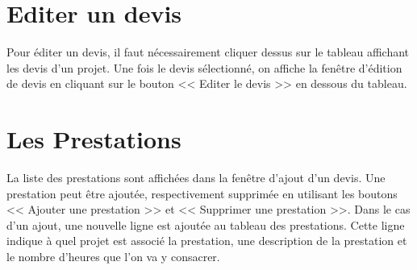 \section{Editer un devis}
Pour éditer un devis, il faut nécessairement cliquer dessus sur le tableau affichant les devis d'un projet. Une fois le devis sélectionné, on affiche la fenêtre d'édition de devis en cliquant sur le bouton << Editer le devis >> en dessous du tableau.
\section{Les Prestations}
La liste des prestations sont affichées dans la fenêtre d'ajout d'un devis. Une prestation peut être ajoutée, respectivement supprimée en utilisant les boutons << Ajouter une prestation >> et << Supprimer une prestation >>. Dans le cas d'un ajout, une nouvelle ligne est ajoutée au tableau des prestations. Cette ligne indique à quel projet est associé la prestation, une description de la prestation et le nombre d'heures que l'on va y consacrer. 